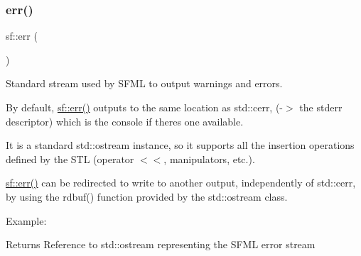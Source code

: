 \subsubsection{\texorpdfstring{err()}{err()}}
{\footnotesize\ttfamily sf\+::err (\begin{DoxyParamCaption}{ }\end{DoxyParamCaption})}



Standard stream used by S\+F\+ML to output warnings and errors. 

\begin{DoxyVerb}\end{DoxyVerb}


By default, \mbox{\hyperlink{group__system_ga7fe7f475639e26334606b5142c29551f}{sf\+::err()}} outputs to the same location as std\+::cerr, (-\/$>$ the stderr descriptor) which is the console if there\textquotesingle{}s one available.

It is a standard std\+::ostream instance, so it supports all the insertion operations defined by the S\+TL (operator $<$$<$, manipulators, etc.).

\mbox{\hyperlink{group__system_ga7fe7f475639e26334606b5142c29551f}{sf\+::err()}} can be redirected to write to another output, independently of std\+::cerr, by using the rdbuf() function provided by the std\+::ostream class.

Example\+: 
\begin{DoxyCode}{0}
\DoxyCodeLine{\textcolor{comment}{// Redirect to a file}}
\DoxyCodeLine{}
\DoxyCodeLine{\textcolor{comment}{// Redirect to nothing}}
\DoxyCodeLine{}
\DoxyCodeLine{\textcolor{comment}{// Restore the original output}}
\end{DoxyCode}


\begin{DoxyReturn}{Returns}
Reference to std\+::ostream representing the S\+F\+ML error stream \begin{DoxyVerb}\end{DoxyVerb}
 
\end{DoxyReturn}
\mbox{\label{group__system_ga9f5460043bdbd5be0ccccd2e6f0ddc41}} 
